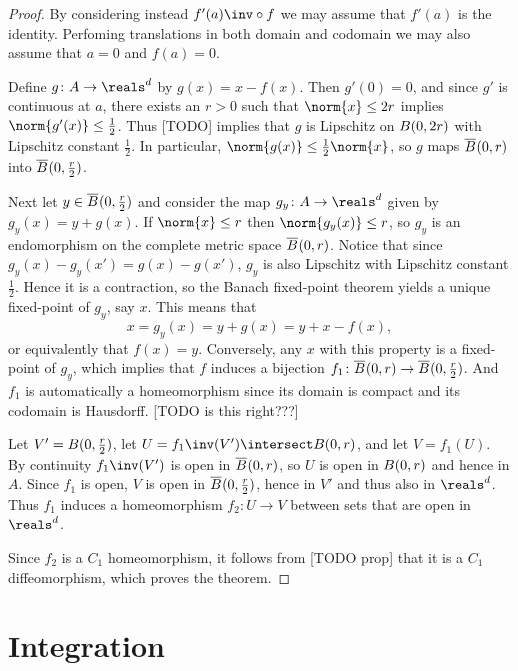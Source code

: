 \documentclass[article, a4paper, 11pt, oneside]{memoir}
\numberwithin{equation}{chapter}
\begin{document}
\begin{proof}
    By considering instead $f'(a)\inv \circ f$ we may assume that $f'(a)$ is the identity. Perfoming translations in both domain and codomain we may also assume that $a = 0$ and $f(a) = 0$.

    Define $g \colon A \to \reals^d$ by $g(x) = x - f(x)$. Then $g'(0) = 0$, and since $g'$ is continuous at $a$, there exists an $r > 0$ such that $\norm{x} \leq 2r$ implies $\norm{g'(x)} \leq \tfrac{1}{2}$. Thus [TODO] implies that $g$ is Lipschitz on $B_{}(0,2r)$ with Lipschitz constant $\tfrac{1}{2}$. In particular, $\norm{g(x)} \leq \tfrac{1}{2} \norm{x}$, so $g$ maps $\overline{B}_{}(0,r)$ into $\overline{B}_{}(0,\tfrac{r}{2})$.

    Next let $y \in \overline{B}_{}(0,\tfrac{r}{2})$ and consider the map $g_y \colon A \to \reals^d$ given by $g_y(x) = y + g(x)$. If $\norm{x} \leq r$ then $\norm{g_y(x)} \leq r$, so $g_y$ is an endomorphism on the complete metric space $\overline{B}_{}(0,r)$. Notice that since $g_y(x) - g_y(x') = g(x) - g(x')$, $g_y$ is also Lipschitz with Lipschitz constant $\tfrac{1}{2}$. Hence it is a contraction, so the Banach fixed-point theorem yields a unique fixed-point of $g_y$, say $x$. This means that
    \begin{equation*}
        x
            = g_y(x)
            = y + g(x)
            = y + x - f(x),
    \end{equation*}
    or equivalently that $f(x) = y$. Conversely, any $x$ with this property is a fixed-point of $g_y$, which implies that $f$ induces a bijection $f_1 \colon \overline{B}_{}(0,r) \to \overline{B}_{}(0,\tfrac{r}{2})$. And $f_1$ is automatically a homeomorphism since its domain is compact and its codomain is Hausdorff. [TODO is this right???]

    Let $V' = B_{}(0,\tfrac{r}{2})$, let $U = f_1\inv(V') \intersect \ball{0}{r}$, and let $V = f_1(U)$. By continuity $f_1\inv(V')$ is open in $\overline{B}_{}(0,r)$, so $U$ is open in $B_{}(0,r)$ and hence in $A$. Since $f_1$ is open, $V$ is open in $\overline{B}_{}(0,\tfrac{r}{2})$, hence in $V'$ and thus also in $\reals^d$. Thus $f_1$ induces a homeomorphism $f_2 \colon U \to V$ between sets that are open in $\reals^d$.

    Since $f_2$ is a $C_1$ homeomorphism, it follows from [TODO prop] that it is a $C_1$ diffeomorphism, which proves the theorem.
\end{proof}




\chapter{Integration}
\end{document}
